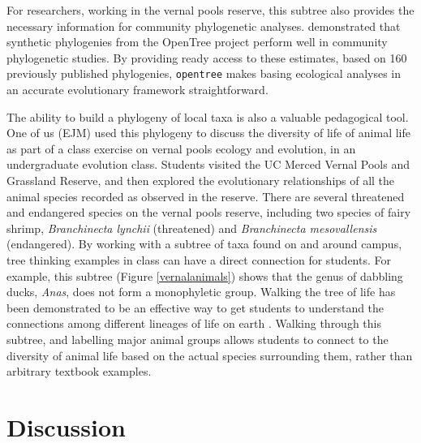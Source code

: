 \documentclass[oupdraft]{sysbio_sse}
\begin{document}
For researchers, working in the vernal pools reserve, this subtree also provides the necessary information for community phylogenetic analyses. \citet{li_for_2019} demonstrated that synthetic phylogenies from the OpenTree project perform well in community phylogenetic studies. By providing ready access to these estimates, based on 160 previously published phylogenies, \texttt{opentree} makes basing ecological analyses in an accurate evolutionary framework straightforward.


The ability to build a phylogeny of local taxa is also a valuable pedagogical tool. One of us (EJM) used this phylogeny to discuss the diversity of life of animal life as part of a class exercise on vernal pools ecology and evolution, in an undergraduate evolution class.
Students visited the UC Merced Vernal Pools and Grassland Reserve, and then explored the evolutionary relationships of all the animal species recorded as observed in the reserve.
There are several threatened and endangered species on the vernal pools reserve, including two species of fairy shrimp, \textit{Branchinecta lynchii} (threatened) and \textit{Branchinecta mesovallensis} (endangered).
By working with a subtree of taxa found on and around campus, tree thinking examples in class can have a direct connection for students. For example, this subtree (Figure \ref{vernalanimals}) shows that the genus of dabbling ducks, \textit{Anas}, does not form a monophyletic group. Walking the tree of life has been demonstrated to be an effective way to get students to understand the connections among different lineages of life on earth \citep{ballen_walking_2017}. Walking through this subtree, and labelling major animal groups allows students to connect to the diversity of animal life based on the actual species surrounding them, rather than arbitrary textbook examples.

\bigskip
\section{Discussion}
\label{sec5}
\end{document}
